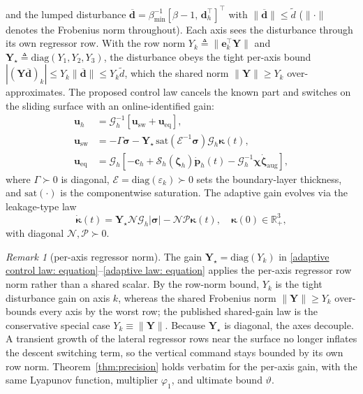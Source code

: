 \documentclass{IEEEtaes}
\theoremstyle{definition}
\theoremstyle{remark}
\newtheorem{remark}{Remark}
\begin{document}
and the lumped disturbance $\boldsymbol{\overline{d}}=\beta_{\min}^{-1}[\beta-1,\,\boldsymbol{d}_h^\top]^\top$ with $\|\boldsymbol{\overline{d}}\|\le\tilde{d}$ ($\|\cdot\|$ denotes the Frobenius norm throughout). Each axis sees the disturbance through its own regressor row. With the row norm $Y_k\triangleq\|\boldsymbol{e}_k^\top\boldsymbol{Y}\|$ and $\boldsymbol{Y}_\star\triangleq\mathrm{diag}(Y_1,Y_2,Y_3)$, the disturbance obeys the tight per-axis bound $|(\boldsymbol{Y}\boldsymbol{\overline{d}})_k|\le Y_k\|\boldsymbol{\overline{d}}\|\le Y_k\tilde{d}$, which the shared norm $\|\boldsymbol{Y}\|\ge Y_k$ over-approximates. The proposed control law cancels the known part and switches on the sliding surface with an online-identified gain:
\begin{align} \label{adaptive control law: equation}
    \boldsymbol{u}_h &= \mathcal{G}_h^{-1}[\boldsymbol{u}_\text{sw}+\boldsymbol{u}_\text{eq}],\nonumber\\
    \boldsymbol{u}_\text{sw} &= -\Gamma\boldsymbol{\sigma} - \boldsymbol{Y}_\star\,\text{sat}(\mathcal{E}^{-1}\boldsymbol{\sigma})\mathcal{G}_h\boldsymbol{\kappa}(t),\\
    \boldsymbol{u}_\text{eq} &= \mathcal{G}_h\!\left[-\boldsymbol{c}_h+\mathcal{S}_h(\boldsymbol{\zeta}_h)\dot{\boldsymbol{p}}_h(t)-\mathcal{G}_h^{-1}\boldsymbol{\chi}\dot{\boldsymbol{\zeta}}_\text{aug}\right],\nonumber
\end{align}
where $\Gamma\succ 0$ is diagonal, $\mathcal{E}=\text{diag}(\varepsilon_k)\succ 0$ sets the boundary-layer thickness, and $\text{sat}(\cdot)$ is the componentwise saturation. The adaptive gain evolves via the leakage-type law
\begin{equation} \label{adaptive law: equation}
    \dot{\boldsymbol{\kappa}}(t) = \boldsymbol{Y}_\star\mathcal{N}\mathcal{G}_h|\boldsymbol{\sigma}| - \mathcal{N}\mathcal{P}\boldsymbol{\kappa}(t),\quad\boldsymbol{\kappa}(0)\in\mathbb{R}_+^3,
\end{equation}
with diagonal $\mathcal{N},\mathcal{P}\succ 0$.

\begin{remark}[per-axis regressor norm]\label{rem:peraxis} The gain $\boldsymbol{Y}_\star=\mathrm{diag}(Y_k)$ in \eqref{adaptive control law: equation}--\eqref{adaptive law: equation} applies the per-axis regressor row norm rather than a shared scalar. By the row-norm bound, $Y_k$ is the tight disturbance gain on axis $k$, whereas the shared Frobenius norm $\|\boldsymbol{Y}\|\ge Y_k$ over-bounds every axis by the worst row; the published shared-gain law is the conservative special case $Y_k\equiv\|\boldsymbol{Y}\|$. Because $\boldsymbol{Y}_\star$ is diagonal, the axes decouple. A transient growth of the lateral regressor rows near the surface no longer inflates the descent switching term, so the vertical command stays bounded by its own row norm. Theorem~\ref{thm:precision} holds verbatim for the per-axis gain, with the same Lyapunov function, multiplier $\varphi_1$, and ultimate bound $\vartheta$.\end{remark}
\end{document}
